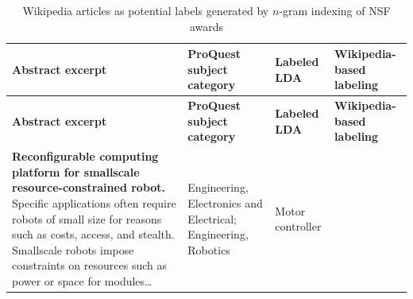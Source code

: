 \documentclass[]{krantz}
\begin{document}
\begin{longtable}[]{@{}llll@{}}
\caption{\label{tab:table7-1} Wikipedia articles as potential labels
generated by \(n\)-gram indexing of NSF awards}\tabularnewline
\toprule
\begin{minipage}[b]{0.64\columnwidth}\raggedright\strut
\textbf{Abstract excerpt}\strut
\end{minipage} & \begin{minipage}[b]{0.12\columnwidth}\raggedright\strut
\textbf{ProQuest subject category}\strut
\end{minipage} & \begin{minipage}[b]{0.03\columnwidth}\raggedright\strut
\textbf{Labeled LDA}\strut
\end{minipage} & \begin{minipage}[b]{0.09\columnwidth}\raggedright\strut
\textbf{Wikipedia-based labeling}\strut
\end{minipage}\tabularnewline
\midrule
\endfirsthead
\toprule
\begin{minipage}[b]{0.64\columnwidth}\raggedright\strut
\textbf{Abstract excerpt}\strut
\end{minipage} & \begin{minipage}[b]{0.12\columnwidth}\raggedright\strut
\textbf{ProQuest subject category}\strut
\end{minipage} & \begin{minipage}[b]{0.03\columnwidth}\raggedright\strut
\textbf{Labeled LDA}\strut
\end{minipage} & \begin{minipage}[b]{0.09\columnwidth}\raggedright\strut
\textbf{Wikipedia-based labeling}\strut
\end{minipage}\tabularnewline
\midrule
\endhead
\begin{minipage}[t]{0.64\columnwidth}\raggedright\strut
\textbf{Reconfigurable computing platform for smallscale
resource-constrained robot.} Specific applications often require robots
of small size for reasons such as costs, access, and stealth. Smallscale
robots impose constraints on resources such as power or space for
modules\ldots{}\strut
\end{minipage} & \begin{minipage}[t]{0.12\columnwidth}\raggedright\strut
Engineering, Electronics and Electrical; Engineering, Robotics\strut
\end{minipage} & \begin{minipage}[t]{0.03\columnwidth}\raggedright\strut
Motor controller\strut
\end{minipage} & \begin{minipage}[t]{0.09\columnwidth}\raggedright\strut

\end{minipage}
\end{longtable}
\end{document}
